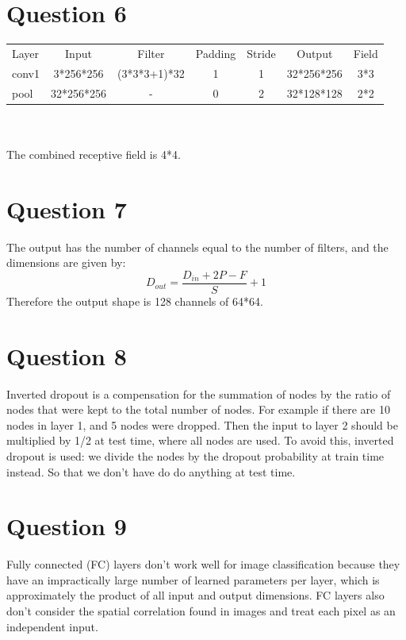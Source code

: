 \documentclass[10pt]{article}
\begin{document}
\section{Question 6}
\begin{tabular}{|l|c|c|c|c|c|c|}
	Layer & Input & Filter & Padding & Stride & Output & Field\\
	conv1 & 3*256*256 & (3*3*3+1)*32 & 1 & 1 & 32*256*256 & 3*3\\
	pool & 32*256*256 & - & 0 & 2 & 32*128*128&2*2\\
\end{tabular}
\\
\\The combined receptive field is 4*4.

\section{Question 7}
The output has the number of channels equal to the number of filters, and the dimensions are given by:
\[
	D_{out}=\frac{D_{in}+2P-F}{S}+1
\]
Therefore the output shape is 128 channels of 64*64.

\section{Question 8}
Inverted dropout is a compensation for the summation of nodes by the ratio of nodes that were kept to the total number of nodes. For example if there are 10 nodes in layer 1, and 5 nodes were dropped. Then the input to layer 2 should be multiplied by 1/2 at test time, where all nodes are used. To avoid this, inverted dropout is used: we divide the nodes by the dropout probability at train time instead. So that we don't have do do anything at test time.

\section{Question 9}
Fully connected (FC) layers don't work well for image classification because they have an impractically large number of learned parameters per layer, which is approximately the product of all input and output dimensions. FC layers also don't consider the spatial correlation found in images and treat each pixel as an independent input.
\end{document}
